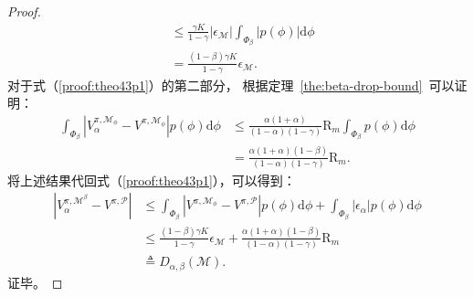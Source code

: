 \begin{proof}
\begin{equation}
\begin{aligned}
&\leq \frac{\gamma K}{1-\gamma}\left|\epsilon_{\mathcal{M}}\right|\int_{\Phi_\beta}\left|p(\phi)\right|\mathrm{d}\phi\\
&=\frac{(1-\beta)\gamma K}{1-\gamma}\epsilon_{\mathcal{M}}. \label{proof:theo43p2}
\end{aligned}
\end{equation}
对于式（\ref{proof:theo43p1}）的第二部分， 根据定理~\ref{the:beta-drop-bound}~可以证明：
\begin{equation}
\begin{aligned}
\int_{\Phi_\beta}\left|{V}_\alpha^{\pi, \mathcal{M}_{\phi}} - {V}^{\pi,\mathcal{M}_{\phi}}\right|p(\phi)\mathrm{d}\phi&\leq \frac{\alpha(1+\alpha)}{(1-\alpha)(1-\gamma)}\mathrm{R}_m\int_{\Phi_\beta}p(\phi)\mathrm{d}\phi\\
&=\frac{\alpha(1+\alpha)(1-\beta)}{(1-\alpha)(1-\gamma)}\mathrm{R}_m. \label{proof:theo43p3}
\end{aligned}
\end{equation}
将上述结果代回式（\ref{proof:theo43p1}），可以得到：
\begin{equation}
\begin{aligned}
\left|{V}_\alpha^{\pi, \mathcal{M}^\beta}-{V}^{\pi, \mathcal{P}}\right| &\leq \int_{\Phi_\beta}\left|{V}^{\pi, \mathcal{M}_{\phi}}-{V}^{\pi, \mathcal{P}}\right|p(\phi)\mathrm{d}\phi+\int_{\Phi_\beta}\left|\epsilon_\alpha\right|p(\phi)\mathrm{d}\phi\\
&\leq \frac{(1-\beta)\gamma K}{1-\gamma}\epsilon_{\mathcal{M}}+\frac{\alpha(1+\alpha)(1-\beta)}{(1-\alpha)(1-\gamma)}\mathrm{R}_m\\
&\triangleq D_{\alpha,\beta}(\mathcal{M}).
\end{aligned}
\end{equation}
证毕。
\end{proof}


